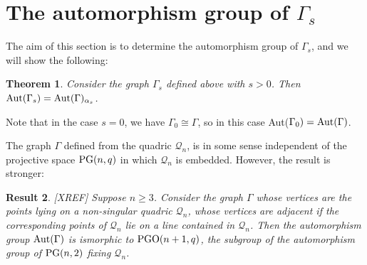 \documentclass[12pt]{article}
\newtheorem{theorem}{Theorem}[section]
\newtheorem{result}[theorem]{Result}
\newcommand{\Q}{\mathscr Q}
\newcommand\PG{{\rm PG}}
\newcommand\PGO{{\rm PGO}}
\newcommand{\Label}{\label}
\newcommand\red[1]{{\color{red} #1}}
\begin{document}
%
%
%


\section{The automorphism group of $\Gamma_s$}
The aim of this section is to determine the automorphism group of $\Gamma_s$, and we will show the following:


\begin{theorem}\Label{aut-thm}
Consider the graph $\Gamma_s$ defined above with $s>0$. Then ${\rm Aut}(\Gamma_s)={\rm Aut}(\Gamma)_{\alpha_s}$.
\end{theorem}

Note that in the case $s=0$, we have $\Gamma_0\cong\Gamma$, so in this case {\rm Aut}($\Gamma_0)={\rm Aut}(\Gamma)$.

The graph $\Gamma$ defined from the quadric $\Q_n$, is in some sense independent of the projective space $\PG(n,q)$ in which $\Q_n$ is embedded.  However, the result is stronger:
\red{
\begin{result}\Label{res:same-auto} [XREF]
Suppose  $n\ge 3$. Consider the graph $\Gamma$ whose vertices are the points lying on a non-singular quadric $\Q_n$, whose vertices are adjacent if the corresponding points of $\Q_n$ lie on a line contained in $\Q_n$.  Then the automorphism group ${\rm Aut}(\Gamma)$ is ismorphic to $\PGO(n+1,q)$, the subgroup of the automorphism group of  $\PG(n,2)$ fixing $\Q_n$.
\end{result}
}
\end{document}
